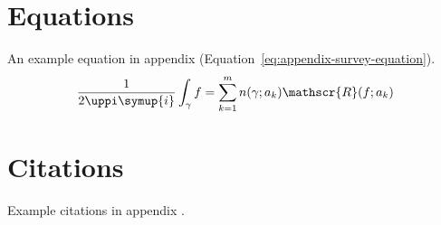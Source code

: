 \begin{survey}
\section{Equations}

An example equation in appendix (Equation~\eqref{eq:appendix-survey-equation}).
\begin{equation}
  \frac{1}{2 \uppi \symup{i}} \int_\gamma f = \sum_{k=1}^m n(\gamma; a_k) \mathscr{R}(f; a_k)
  \label{eq:appendix-survey-equation}
\end{equation}


\section{Citations}

Example\cite{dupont1974bone} citations\cite{merkt1995rotational} in appendix
\cite{dupont1974bone,merkt1995rotational}.



% 

\printbibliography

\end{survey}
